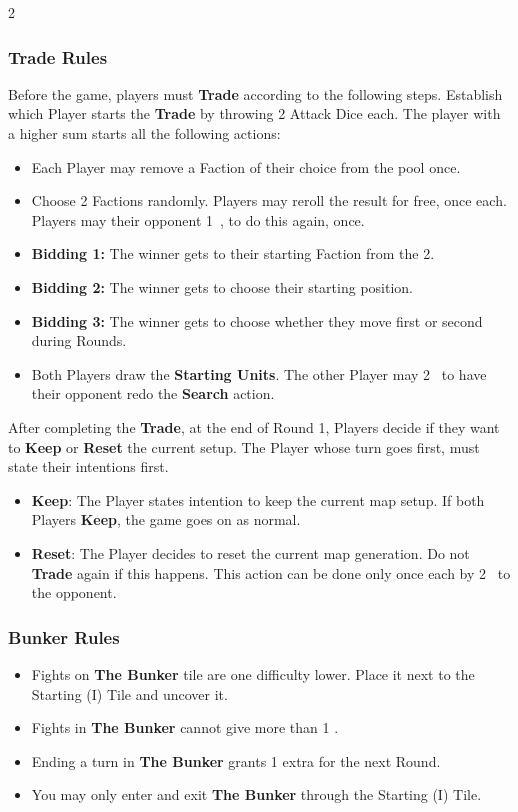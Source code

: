 \begin{multicols}{2}
\columnbreak

\subsubsection*{Trade Rules}
Before the game, players must \textbf{Trade} according to the following steps. Establish which Player starts the \textbf{Trade} by throwing 2 Attack Dice each. The player with a higher sum starts all the following actions:
\begin{itemize}
  \item Each Player may remove a Faction of their choice from the pool once.
  \item Choose 2 Factions randomly. Players may reroll the result for free, once each. Players may  their opponent 1~, to do this again, once.
  \item \textbf{Bidding 1:} The winner gets to their starting Faction from the 2.
  \item \textbf{Bidding 2:} The winner gets to choose their starting position.
  \item \textbf{Bidding 3:} The winner gets to choose whether they move first or second during Rounds.
  \item Both Players draw the \textbf{Starting Units}. The other Player may  2~ to have their opponent redo the \textbf{Search} action.
\end{itemize}
After completing the \textbf{Trade}, at the end of Round 1, Players decide if they want to \textbf{Keep} or \textbf{Reset} the current setup. The Player whose turn goes first, must state their intentions first.
\begin{itemize}
  \item \textbf{Keep}: The Player states intention to keep the current map setup. If both Players \textbf{Keep}, the game goes on as normal.
  \item \textbf{Reset}: The Player decides to reset the current map generation. Do not \textbf{Trade} again if this happens. This action can be done only once each by  2~ to the opponent.
\end{itemize}

\vspace*{\fill}
\columnbreak

\subsubsection*{Bunker Rules}
\begin{itemize}
  \item Fights on \textbf{The Bunker} tile are one difficulty lower. Place it next to the Starting (I) Tile and uncover it.
  \item Fights in \textbf{The Bunker} cannot give more than 1 .
  \item Ending a turn in \textbf{The Bunker} grants 1 extra  for the next Round.
  \item You may only enter and exit \textbf{The Bunker} through the Starting (I) Tile.
\end{itemize}


\end{multicols}
